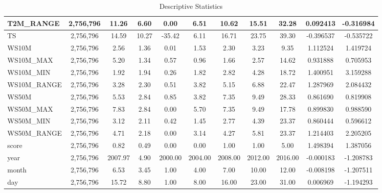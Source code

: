 \documentclass{article}
\begin{document}
\begin{itemize}
\begin{table}[htbp]
\begin{adjustbox}{width=\textwidth}
\begin{tabular}{|l|c|c|c|c|c|c|c|c|c|c|}
            T2M\_RANGE & 2,756,796 & 11.26 & 6.60 & 0.00 & 6.51 & 10.62 & 15.51 & 32.28 & 0.092413 & -0.316984 \\ \hline
            TS & 2,756,796 & 14.59 & 10.27 & -35.42 & 6.11 & 16.71 & 23.75 & 39.30 & -0.396537 & -0.535722 \\ \hline
            WS10M & 2,756,796 & 2.56 & 1.36 & 0.01 & 1.53 & 2.30 & 3.23 & 9.35 & 1.112524 & 1.419724 \\ \hline
            WS10M\_MAX & 2,756,796 & 5.20 & 1.34 & 0.57 & 0.96 & 1.66 & 2.57 & 14.62 & 0.931888 & 0.705953 \\ \hline
            WS10M\_MIN & 2,756,796 & 1.92 & 1.94 & 0.26 & 1.82 & 2.82 & 4.28 & 18.72 & 1.400951 & 3.159288 \\ \hline
            WS10M\_RANGE & 2,756,796 & 3.28 & 2.30 & 0.51 & 3.82 & 5.15 & 6.88 & 22.47 & 1.287969 & 2.084432 \\ \hline
            WS50M & 2,756,796 & 5.53 & 2.84 & 0.85 & 3.82 & 7.35 & 9.49 & 28.33 & 0.861690 & 0.819908 \\ \hline
            WS50M\_MAX & 2,756,796 & 7.83 & 2.84 & 0.00 & 5.70 & 7.35 & 9.49 & 17.78 & 0.899830 & 0.988590 \\ \hline
            WS50M\_MIN & 2,756,796 & 3.12 & 2.11 & 0.42 & 1.45 & 2.77 & 4.39 & 23.37 & 0.860444 & 0.596612 \\ \hline
            WS50M\_RANGE & 2,756,796 & 4.71 & 2.18 & 0.00 & 3.14 & 4.27 & 5.81 & 23.37 & 1.214403 & 2.205205 \\ \hline
            score & 2,756,796 & 0.82 & 0.49 & 0.00 & 0.00 & 1.00 & 1.00 & 5.00 & 1.498394 & 1.387056 \\ \hline
            year & 2,756,796 & 2007.97 & 4.90 & 2000.00 & 2004.00 & 2008.00 & 2012.00 & 2016.00 & -0.000183 & -1.208783 \\ \hline
            month & 2,756,796 & 6.53 & 3.45 & 1.00 & 4.00 & 7.00 & 10.00 & 12.00 & -0.008198 & -1.207511 \\ \hline
            day & 2,756,796 & 15.72 & 8.80 & 1.00 & 8.00 & 16.00 & 23.00 & 31.00 & 0.006969 & -1.194293 \\ \hline
            \end{tabular}
            \end{adjustbox}
            \caption{Descriptive Statistics}
            \label{tab:descriptive_statistics}
            \end{table}


\end{itemize}
\end{document}
